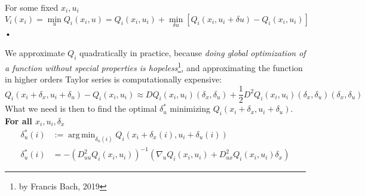 \documentclass{report}
\DeclareMathOperator*{\argmin}{arg\,min}
\begin{document}
For some fixed $x_i,u_i$
\begin{equation}
\label{eq:V}
V_i(x_i) = \min_u Q_i(x_i,u) = Q_i(x_i, u_i) + \min_{\delta u} [Q_i(x_i,u_i + \delta u) - Q_i(x_i,u_i)] 
\end{equation}•
 

We approximate $Q_i$ quadratically in practice, because \emph{doing global optimization of a function without special properties is hopeless}\footnote{by Francis Bach, 2019}, and approximating the function in higher orders Taylor series is computationally expensive: 
\begin{equation}
\label{Q approx}
Q_i(x_i + \delta_x, u_i + \delta_u )- Q_i(x_i,u_i)\approx DQ_i(x_i,u_i)(\delta_x, \delta_u) + \frac{1}{2}D^2 Q_i (x_i,u_i) (\delta_x, \delta_u)(\delta_x, \delta_u)
\end{equation}
What we need is then to find the optimal $\delta_u^*$ minimizing $Q_i(x_i + \delta_x, u_i + \delta_u )$. \textbf{For all $x_i,u_i, \delta_x$} 
\begin{equation}
\begin{split}
\delta_u^* (i) &:= \argmin_{\delta_u(i)}Q_i(x_i + \delta_x(i), u_i + \delta_u(i) ) \\
\delta_u^* (i)&= -(D^2_{uu}Q_i(x_i, u_i))^{-1} (\nabla_u Q_i(x_i,u_i) + D^2_{ux} Q_i(x_i,u_i) \delta_x)
\end{split}
\end{equation}
\end{document}
